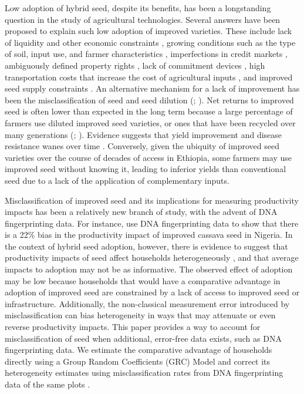 \documentclass[11pt]{article}
\begin{document}

Low adoption of hybrid seed, despite its benefits, has been a longstanding question in the study of agricultural technologies. Several answers have been proposed to explain such low adoption of improved varieties. These include lack of liquidity and other economic constraints \citep{Carter2014-fm}, growing conditions such as the type of soil, input use, and farmer characteristics \citep{Munshi2004-og}, imperfections in credit markets \citep{Croppenstedt2003-pq}, ambiguously defined property rights \citep{Place2000-el}, lack of commitment devices \citep{Duflo2009-iv}, high transportation costs that increase the cost of agricultural inputs \citep{Byerlee2013-qk}, and improved seed supply constraints \citep{Bird2020-nt}. An alternative mechanism for a lack of improvement has been the misclassification of seed and seed dilution (\citealt{wossen2022misperceiving}; \citealt{kosmowski2019varietal}). Net returns to improved seed is often lower than expected in the long term because a large percentage of farmers use diluted improved seed varieties, or ones that have been recycled over many generations (\citealt{euler2022because}; \citealt{wossen2019estimating}). Evidence suggests that yield improvement and disease resistance wanes over time \citep{Abate2015-rj}. Conversely, given the ubiquity of improved seed varieties over the course of decades of access in Ethiopia, some farmers may use improved seed without knowing it, leading to inferior yields than conventional seed due to a lack of the application of complementary inputs. 

Misclassification of improved seed and its implications for measuring productivity impacts has been a relatively new branch of study, with the advent of DNA fingerprinting data. For instance, \cite{wossen2019estimating} use DNA fingerprinting data to show that there is a 22\% bias in the productivity impact of improved cassava seed in Nigeria. In the context of hybrid seed adoption, however, there is evidence to suggest that productivity impacts of seed affect households heterogeneously \citep{Suri2011-oi}, and that average impacts to adoption may not be as informative. The observed effect of adoption may be low because households that would have a comparative advantage in adoption of improved seed are constrained by a lack of access to improved seed or infrastructure. Additionally, the non-classical measurement error introduced by misclassification can bias heterogeneity in ways that may attenuate or even reverse productivity impacts. This paper provides a way to account for misclassification of seed when additional, error-free data exists, such as DNA fingerprinting data. We estimate the comparative advantage of households directly using a Group Random Coefficients (GRC) Model and correct its heterogeneity estimates using misclassification rates from DNA fingerprinting data of the same plots \citep{Suri2011-oi, Tjernstrom_Emilia_Dalia_Ghanem_Oscar_Barriga_Cabanillas_Travis_J_Lybbert_Jeffrey_D_Michler_and_Aleksandr_Michuda2020-bc}. 
\end{document}
